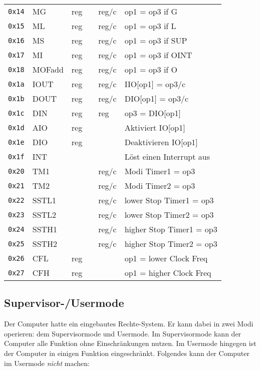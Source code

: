 \documentclass{scrartcl}
\begin{document}
\begin{center}
\begin{table*}
\begin{tabular}{l | l l l l | l}
			\texttt{0x14} & MG   & reg &  & reg/c & op1 = op3 if G \\
			\texttt{0x15} & ML   & reg &  & reg/c & op1 = op3 if L \\
			\texttt{0x16} & MS & reg &  & reg/c & op1 = op3 if SUP \\
			\texttt{0x17} & MI & reg &  & reg/c & op1 = op3 if OINT \\
			\texttt{0x18} & MOFadd  & reg &  & reg/c & op1 = op3 if O \\
			\hline
			\texttt{0x1a} & IOUT & reg &  & reg/c & IIO[op1] = op3/c \\
			\texttt{0x1b} & DOUT & reg &  & reg/c & DIO[op1] = op3/c \\
			\texttt{0x1c} & DIN  & reg &  & reg & op3 = DIO[op1] \\
			\texttt{0x1d} & AIO  & reg &  &  & Aktiviert IO[op1] \\
			\texttt{0x1e} & DIO  & reg &  &  & Deaktivieren IO[op1] \\
			\hline
			\texttt{0x1f} & INT  & & & & Löst einen Interrupt aus \\
			\texttt{0x20} & TM1  & & & reg/c & Modi Timer1 = op3 \\
			\texttt{0x21} & TM2  & & & reg/c & Modi Timer2 = op3 \\
			\texttt{0x22} & SSTL1 & & & reg/c & lower Stop Timer1 = op3 \\
			\texttt{0x23} & SSTL2 & & & reg/c & lower Stop Timer2 = op3 \\
			\texttt{0x24} & SSTH1 & & & reg/c & higher Stop Timer1 = op3 \\			
			\texttt{0x25} & SSTH2 & & & reg/c & higher Stop Timer2 = op3 \\
			\texttt{0x26} & CFL  & reg & & & op1 = lower Clock Freq \\
			\texttt{0x27} & CFH  & reg & & & op1 = higher Clock Freq \\
			
			\hline
		\end{tabular}
	\end{table*}
\end{center}


\subsection{\label{section:supervisor}Supervisor-/Usermode}

Der Computer hatte ein eingebautes Rechte-System.
Er kann dabei in zwei Modi operieren: dem Supervisormode und Usermode.
Im Supervisormode kann der Computer alle Funktion ohne Einschränkungen nutzen.
Im Usermode hingegen ist der Computer in einigen Funktion eingeschränkt.
Folgendes kann der Computer im Usermode \emph{nicht} machen:
\end{document}
